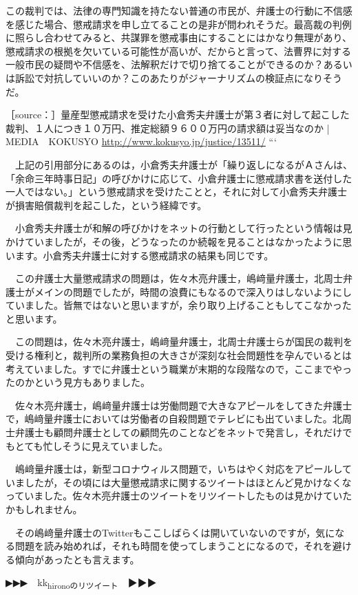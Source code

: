 \documentclass[]{ltjarticle}
\begin{document}
この裁判では、法律の専門知識を持たない普通の市民が、弁護士の行動に不信感を感じた場合、懲戒請求を申し立てることの是非が問われそうだ。最高裁の判例に照らし合わせてみると、共謀罪を懲戒事由にすることにはかなり無理があり、懲戒請求の根拠を欠いている可能性が高いが、だからと言って、法曹界に対する一般市民の疑問や不信感を、法解釈だけで切り捨てることができるのか？あるいは訴訟で対抗していいのか？このあたりがジャーナリズムの検証点になりそうだ。

［source：］量産型懲戒請求を受けた小倉秀夫弁護士が第３者に対して起こした裁判、１人につき１０万円、推定総額９６００万円の請求額は妥当なのか | MEDIA　KOKUSYO \url{http://www.kokusyo.jp/justice/13511/}
```

　上記の引用部分にあるのは，小倉秀夫弁護士が「繰り返しになるがＡさんは、「余命三年時事日記」の呼びかけに応じて、小倉弁護士に懲戒請求書を送付した一人ではない。」という懲戒請求を受けたことと，それに対して小倉秀夫弁護士が損害賠償裁判を起こした，という経緯です。

　小倉秀夫弁護士が和解の呼びかけをネットの行動として行ったという情報は見かけていましたが，その後，どうなったのか続報を見ることはなかったように思います。小倉秀夫弁護士に対する懲戒請求の結果も同じです。

　この弁護士大量懲戒請求の問題は，佐々木亮弁護士，嶋﨑量弁護士，北周士弁護士がメインの問題でしたが，時間の浪費にもなるので深入りはしないようにしていました。皆無ではないと思いますが，余り取り上げることもしてこなかったと思います。

　この問題は，佐々木亮弁護士，嶋﨑量弁護士，北周士弁護士らが国民の裁判を受ける権利と，裁判所の業務負担の大きさが深刻な社会問題性を孕んでいるとは考えていました。すでに弁護士という職業が末期的な段階なので，ここまでやったのかという見方もありました。

　佐々木亮弁護士，嶋﨑量弁護士は労働問題で大きなアピールをしてきた弁護士で，嶋﨑量弁護士においては労働者の自殺問題でテレビにも出ていました。北周士弁護士も顧問弁護士としての顧問先のことなどをネットで発言し，それだけでもとても忙しそうに見えていました。

　嶋﨑量弁護士は，新型コロナウィルス問題で，いちはやく対応をアピールしていましたが，その頃には大量懲戒請求に関するツイートはほとんど見かけなくなっていました。佐々木亮弁護士のツイートをリツイートしたものは見かけていたかもしれません。

　その嶋﨑量弁護士のTwitterもここしばらくは開いていないのですが，気になる問題を読み始めれば，それも時間を使ってしまうことになるので，それを避ける傾向があったとも言えます。

▶▶▶　kk\textsubscript{hironoのリツイート}　▶▶▶  
\end{document}
